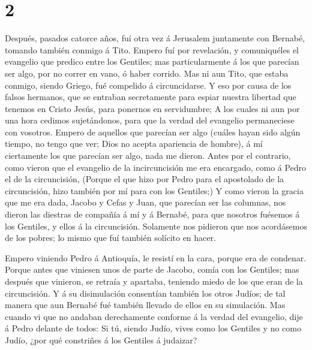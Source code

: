\hypertarget{section-1}{%
\section{2}\label{section-1}}

 Después, pasados catorce años, fuí otra vez á Jerusalem
juntamente con Bernabé, tomando también conmigo á Tito. 
Empero fuí por revelación, y comuniquéles el evangelio que predico entre
los Gentiles; mas particularmente á los que parecían ser algo, por no
correr en vano, ó haber corrido.  Mas ni aun Tito, que
estaba conmigo, siendo Griego, fué compelido á circuncidarse.
 Y eso por causa de los falsos hermanos, que se entraban
secretamente para espiar nuestra libertad que tenemos en Cristo Jesús,
para ponernos en servidumbre;  A los cuales ni aun por una
hora cedimos sujetándonos, para que la verdad del evangelio permaneciese
con vosotros.  Empero de aquellos que parecían ser algo
(cuáles hayan sido algún tiempo, no tengo que ver; Dios no acepta
apariencia de hombre), á mí ciertamente los que parecían ser algo, nada
me dieron.  Antes por el contrario, como vieron que el
evangelio de la incircuncisión me era encargado, como á Pedro el de la
circuncisión,  (Porque el que hizo por Pedro para el
apostolado de la circuncisión, hizo también por mí para con los
Gentiles;)  Y como vieron la gracia que me era dada, Jacobo
y Cefas y Juan, que parecían ser las columnas, nos dieron las diestras
de compañía á mí y á Bernabé, para que nosotros fuésemos á los Gentiles,
y ellos á la circuncisión.  Solamente nos pidieron que nos
acordásemos de los pobres; lo mismo que fuí también solícito en hacer.

 Empero viniendo Pedro á Antioquía, le resistí en la cara,
porque era de condenar.  Porque antes que viniesen unos de
parte de Jacobo, comía con los Gentiles; mas después que vinieron, se
retraía y apartaba, teniendo miedo de los que eran de la circuncisión.
 Y á su disimulación consentían también los otros Judíos;
de tal manera que aun Bernabé fué también llevado de ellos en su
simulación.  Mas cuando vi que no andaban derechamente
conforme á la verdad del evangelio, dije á Pedro delante de todos: Si
tú, siendo Judío, vives como los Gentiles y no como Judío, ¿por qué
constriñes á los Gentiles á judaizar?

